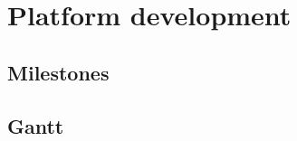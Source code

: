 \chapter{Platform development}\label{C:platformDevelopment}

\section{Milestones}

\section{Gantt}


